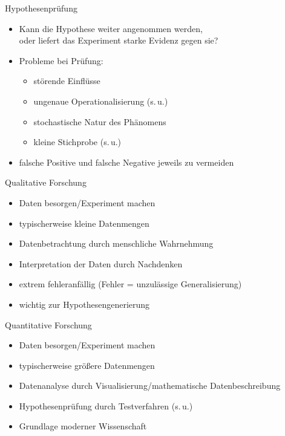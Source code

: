 \begin{frame}
  {Hypothesenprüfung}
  \begin{itemize}[<+->]
    \item Kann die Hypothese weiter angenommen werden,\\
      oder liefert das Experiment starke Evidenz gegen sie?
    \item Probleme bei Prüfung:
      \begin{itemize}[<+->]
	\item störende Einflüsse
	\item ungenaue Operationalisierung (s.\,u.)
	\item stochastische Natur des Phänomens
	\item kleine Stichprobe (s.\,u.)
      \end{itemize}
    \item falsche Positive und falsche Negative jeweils zu vermeiden
  \end{itemize}
\end{frame}

\begin{frame}
  {Qualitative Forschung}
  \begin{itemize}[<+->]
    \item Daten besorgen\slash Experiment machen
    \item typischerweise \alert{kleine Datenmengen}
    \item Datenbetrachtung durch menschliche Wahrnehmung
    \item Interpretation der Daten durch Nachdenken
      \Zeile
    \item extrem fehleranfällig (Fehler = unzulässige Generalisierung)
    \item wichtig zur Hypothesengenerierung
  \end{itemize}
\end{frame}

\begin{frame}
  {Quantitative Forschung}
  \begin{itemize}[<+->]
    \item Daten besorgen\slash Experiment machen
    \item typischerweise \alert{größere Datenmengen}
    \item Datenanalyse durch Visualisierung\slash mathematische Datenbeschreibung
    \item Hypothesenprüfung durch \alert{Testverfahren} (s.\,u.)
    \item Grundlage moderner Wissenschaft
  \end{itemize}
\end{frame}

